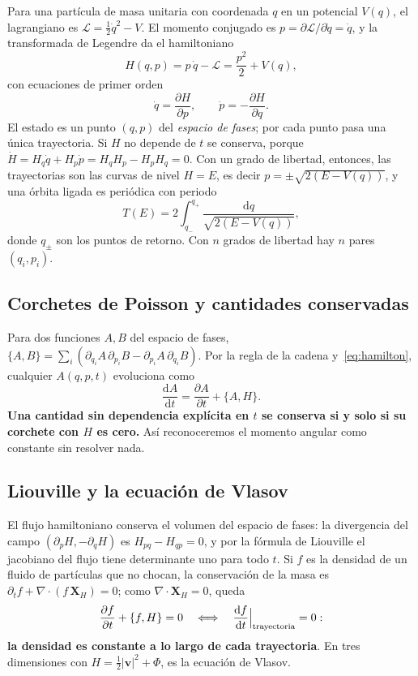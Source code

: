 \documentclass[11pt,a4paper]{article}
\newcommand{\dd}{\mathrm{d}}
\begin{document}
Para una partícula de masa unitaria con coordenada $q$ en un potencial $V(q)$, el
lagrangiano es $\mathcal{L}=\tfrac12\dot q^2-V$. El momento conjugado es
$p=\partial\mathcal{L}/\partial\dot q=\dot q$, y la transformada de Legendre da el
hamiltoniano
\begin{equation}
  H(q,p) = p\,\dot q-\mathcal{L} = \frac{p^2}{2}+V(q),
\end{equation}
con ecuaciones de primer orden
\begin{equation}
  \dot q=\frac{\partial H}{\partial p},\qquad \dot p=-\frac{\partial H}{\partial q}.
  \label{eq:hamilton}
\end{equation}
El estado es un punto $(q,p)$ del \emph{espacio de fases}; por cada punto pasa una única
trayectoria. Si $H$ no depende de $t$ se conserva, porque
$\dot H=H_q\dot q+H_p\dot p=H_qH_p-H_pH_q=0$. Con un grado de libertad, entonces, las
trayectorias son las curvas de nivel $H=E$, es decir
$p=\pm\sqrt{2(E-V(q))}$, y una órbita ligada es periódica con periodo
\begin{equation}
  T(E)=2\int_{q_-}^{q_+}\frac{\dd q}{\sqrt{2(E-V(q))}},
  \label{eq:periodo}
\end{equation}
donde $q_\pm$ son los puntos de retorno. Con $n$ grados de libertad hay $n$ pares
$(q_i,p_i)$.

\subsection{Corchetes de Poisson y cantidades conservadas}

Para dos funciones $A,B$ del espacio de fases,
$\{A,B\}=\sum_i(\partial_{q_i}A\,\partial_{p_i}B-\partial_{p_i}A\,\partial_{q_i}B)$.
Por la regla de la cadena y~\eqref{eq:hamilton}, cualquier $A(q,p,t)$ evoluciona como
\begin{equation}
  \frac{\dd A}{\dd t}=\frac{\partial A}{\partial t}+\{A,H\}.
  \label{eq:evolucion}
\end{equation}
\textbf{Una cantidad sin dependencia explícita en $t$ se conserva si y solo si su
corchete con $H$ es cero.} Así reconoceremos el momento angular como constante sin
resolver nada.

\subsection{Liouville y la ecuación de Vlasov}

El flujo hamiltoniano conserva el volumen del espacio de fases: la divergencia del campo
$(\partial_pH,-\partial_qH)$ es $H_{pq}-H_{qp}=0$, y por la fórmula de Liouville el
jacobiano del flujo tiene determinante uno para todo $t$. Si $f$ es la densidad de un
fluido de partículas que no chocan, la conservación de la masa es
$\partial_tf+\nabla\cdot(f\,\mathbf{X}_H)=0$; como $\nabla\cdot\mathbf{X}_H=0$, queda
\begin{equation}
  \frac{\partial f}{\partial t}+\{f,H\}=0
  \quad\Longleftrightarrow\quad
  \frac{\dd f}{\dd t}\Big|_{\rm trayectoria}=0 :
  \label{eq:liouville}
\end{equation}
\textbf{la densidad es constante a lo largo de cada trayectoria}. En tres dimensiones con
$H=\tfrac12|\mathbf{v}|^2+\Phi$, es la ecuación de Vlasov.
\end{document}
